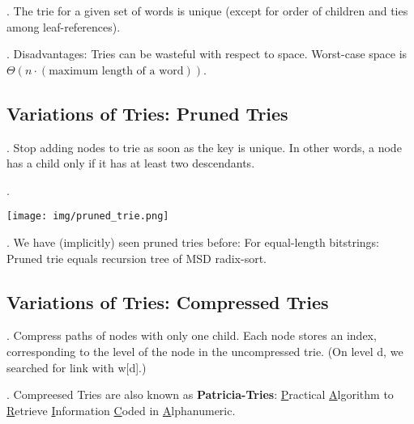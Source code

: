 \documentclass{article}
\begin{document}
\begin{result}[].
    The trie for a given set of words is unique (except for order of children and ties among leaf-references). 
\end{result}

\begin{discovery}[].
    Disadvantages: Tries can be wasteful with respect to space. Worst-case space is $\Theta (n \cdot (\text{maximum length of a word}))$. 
\end{discovery} 

\subsection{Variations of Tries: Pruned Tries} 

\begin{deff}.
    Stop adding nodes to trie as soon as the key is unique. In other words, a node has a child only if it has at least two descendants.
\end{deff}

\begin{examplee}[].
    \begin{center}
        \texttt{[image: img/pruned\_trie.png]}
    \end{center}
\end{examplee}

\begin{discovery}[].
    We have (implicitly) seen pruned tries before: For equal-length bitstrings: Pruned trie equals recursion tree of MSD radix-sort. 
\end{discovery}

\subsection{Variations of Tries: Compressed Tries} 

\begin{deff}.
    Compress paths of nodes with only one child. Each node stores an index, corresponding to the level of the node in the uncompressed trie. (On level d, we searched for link with w[d].)
\end{deff}

\begin{comm}[].
    Compreesed Tries are also known as \textbf{Patricia-Tries}: \underline{P}ractical \underline{A}lgorithm to \underline{R}etrieve \underline{I}nformation \underline{C}oded in \underline{A}lphanumeric. 
\end{comm}
\end{document}
